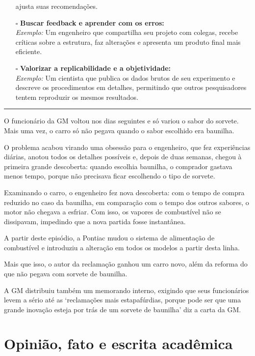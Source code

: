 \documentclass[
  letterpaper,
  DIV=11,
  numbers=noendperiod]{scrreprt}
\begin{document}
\begin{itemize}
  ajusta suas recomendações.
\item[$\square$]
  \textbf{Buscar feedback e aprender com os erros:}\\
  \emph{Exemplo:} Um engenheiro que compartilha seu projeto com colegas,
  recebe críticas sobre a estrutura, faz alterações e apresenta um
  produto final mais eficiente.
\item[$\square$]
  \textbf{Valorizar a replicabilidade e a objetividade:}\\
  \emph{Exemplo:} Um cientista que publica os dados brutos de seu
  experimento e descreve os procedimentos em detalhes, permitindo que
  outros pesquisadores tentem reproduzir os mesmos resultados.
\end{itemize}

\begin{center}\rule{0.5\linewidth}{0.5pt}\end{center}

O funcionário da GM voltou nos dias seguintes e só variou o sabor do
sorvete. Mais uma vez, o carro só não pegava quando o sabor escolhido
era baunilha.

O problema acabou virando uma obsessão para o engenheiro, que fez
experiências diárias, anotou todos os detalhes possíveis e, depois de
duas semanas, chegou à primeira grande descoberta: quando escolhia
baunilha, o comprador gastava menos tempo, porque não precisava ficar
escolhendo o tipo de sorvete.

Examinando o carro, o engenheiro fez nova descoberta: com o tempo de
compra reduzido no caso da baunilha, em comparação com o tempo dos
outros sabores, o motor não chegava a esfriar. Com isso, os vapores de
combustível não se dissipavam, impedindo que a nova partida fosse
instantânea.

A partir deste episódio, a Pontiac mudou o sistema de alimentação de
combustível e introduziu a alteração em todos os modelos a partir desta
linha.

Mais que isso, o autor da reclamação ganhou um carro novo, além da
reforma do que não pegava com sorvete de baunilha.

A GM distribuiu também um memorando interno, exigindo que seus
funcionários levem a sério até as `reclamações mais estapafúrdias,
porque pode ser que uma grande inovação esteja por trás de um sorvete de
baunilha' diz a carta da GM.

\chapter{Opinião, fato e escrita
acadêmica}\label{opiniuxe3o-fato-e-escrita-acaduxeamica}
\end{document}
